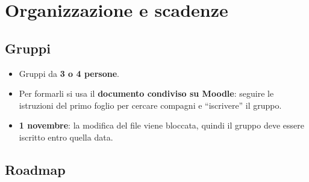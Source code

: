 \documentclass[11pt,a4paper]{article}
\begin{document}
\section{Organizzazione e scadenze}

\subsection{Gruppi}
\begin{itemize}
  \item Gruppi da \textbf{3 o 4 persone}.
  \item Per formarli si usa il \textbf{documento condiviso su Moodle}: seguire le istruzioni del primo
        foglio per cercare compagni e ``iscrivere'' il gruppo.
  \item \textbf{1 novembre}: la modifica del file viene bloccata, quindi il gruppo deve essere iscritto entro quella data.
\end{itemize}

\subsection{Roadmap}
\end{document}
